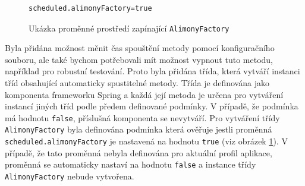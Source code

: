             \begin{figure}
                \begin{verbatim}
scheduled.alimonyFactory=true
                \end{verbatim}
                \caption{Ukázka proměnné prostředí zapínající \texttt{AlimonyFactory}} 
                \label{code:alimony-factory-true}
            \end{figure}
            Byla přidána možnost měnit čas spouštění metody pomocí konfiguračního souboru, ale také bychom potřebovali mít možnost vypnout tuto metodu, například pro robustní testování. Proto byla přidána třída, která vytváří instanci tříd obsahující automaticky spustitelné metody. Třída je definována jako komponenta frameworku Spring a každá její metoda je určena pro vytváření instancí jiných tříd podle předem definované podmínky.
            V případě, že podmínka má hodnotu \verb|false|, příslušná komponenta se nevytváří.
            Pro vytváření třídy \verb|AlimonyFactory| byla definována podmínka která ověřuje jestli proměnná \verb|scheduled.alimonyFactory| je nastavená na hodnotu \verb|true| (viz obrázek \ref{code:alimony-factory-true}). V případě, že tato proměnná nebyla definována pro aktuální profil aplikace, proměnná se automaticky nastaví na hodnotu \verb|false| a instance třídy \verb|AlimonyFactory| nebude vytvořena.
        
